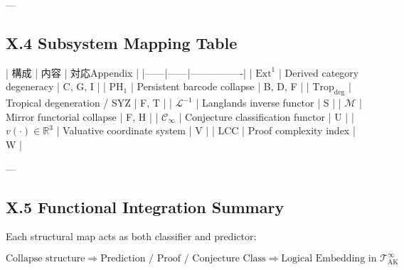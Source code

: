 \documentclass[11pt]{article}
\begin{document}
\vspace{1em}
\begin{center}
\end{center}
\vspace{1em}

---

\subsection*{X.4 Subsystem Mapping Table}

| 構成 | 内容 | 対応Appendix |
|------|------|----------------|
| \( \mathrm{Ext}^1 \) | Derived category degeneracy | C, G, I |
| \( \mathrm{PH}_1 \) | Persistent barcode collapse | B, D, F |
| \( \mathrm{Trop}_{\mathrm{deg}} \) | Tropical degeneration / SYZ | F, T |
| \( \mathcal{L}^{-1} \) | Langlands inverse functor | S |
| \( \mathcal{M} \) | Mirror functorial collapse | F, H |
| \( \mathscr{C}_\infty \) | Conjecture classification functor | U |
| \( v(\cdot) \in \mathbb{R}^3 \) | Valuative coordinate system | V |
| \( \mathrm{LCC} \) | Proof complexity index | W |

---

\subsection*{X.5 Functional Integration Summary}

Each structural map acts as both classifier and predictor:

\[
\text{Collapse structure} \Rightarrow \text{Prediction / Proof / Conjecture Class}
\Rightarrow \text{Logical Embedding in } \mathscr{T}_{\mathrm{AK}}^{\infty}
\]
\end{document}
